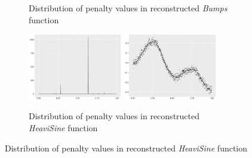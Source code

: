 \begin{figure}
\begin{subfigure}{\textwidth}
    \caption{Distribution of penalty values in reconstructed \textit{Bumps} function}
    \end{subfigure}
    \begin{subfigure}{\textwidth}
    \centering
    \includegraphics[width=0.45\textwidth]{Chapters/02TractorSplineTheory/plot/ggplot/ggHeaviSinePenaltyBar.pdf}
    \includegraphics[width=0.45\textwidth]{Chapters/02TractorSplineTheory/plot/ggplot/ggHeaviSinePenaltyLine.pdf}
    \caption{Distribution of penalty values in reconstructed \textit{HeaviSine} function}
    \end{subfigure}
\end{figure}
